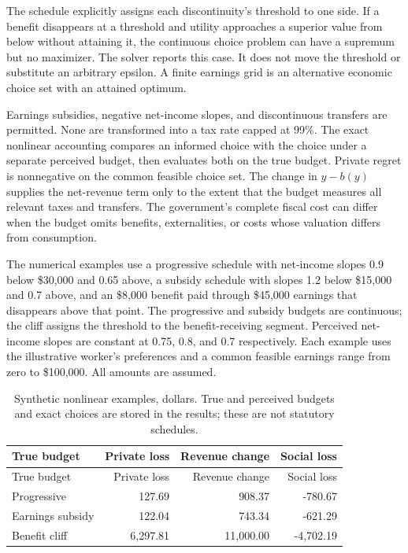 \documentclass[
  11pt,
  letterpaper,
  DIV=11,
  numbers=noendperiod]{scrartcl}
\begin{document}
The schedule explicitly assigns each discontinuity's threshold to one
side. If a benefit disappears at a threshold and utility approaches a
superior value from below without attaining it, the continuous choice
problem can have a supremum but no maximizer. The solver reports this
case. It does not move the threshold or substitute an arbitrary epsilon.
A finite earnings grid is an alternative economic choice set with an
attained optimum.

Earnings subsidies, negative net-income slopes, and discontinuous
transfers are permitted. None are transformed into a tax rate capped at
99\%. The exact nonlinear accounting compares an informed choice with
the choice under a separate perceived budget, then evaluates both on the
true budget. Private regret is nonnegative on the common feasible choice
set. The change in \(y-b(y)\) supplies the net-revenue term only to the
extent that the budget measures all relevant taxes and transfers. The
government's complete fiscal cost can differ when the budget omits
benefits, externalities, or costs whose valuation differs from
consumption.

The numerical examples use a progressive schedule with net-income slopes
0.9 below \$30,000 and 0.65 above, a subsidy schedule with slopes 1.2
below \$15,000 and 0.7 above, and an \$8,000 benefit paid through
\$45,000 earnings that disappears above that point. The progressive and
subsidy budgets are continuous; the cliff assigns the threshold to the
benefit-receiving segment. Perceived net-income slopes are constant at
0.75, 0.8, and 0.7 respectively. Each example uses the illustrative
worker's preferences and a common feasible earnings range from zero to
\$100,000. All amounts are assumed.

\begin{longtable}[]{@{}lrrr@{}}
\caption{Synthetic nonlinear examples, dollars. True and perceived
budgets and exact choices are stored in the results; these are not
statutory schedules.}\label{tbl-nonlinear}\tabularnewline
\toprule\noalign{}
True budget & Private loss & Revenue change & Social loss \\
\midrule\noalign{}
\endfirsthead
\toprule\noalign{}
True budget & Private loss & Revenue change & Social loss \\
\midrule\noalign{}
\endhead
\bottomrule\noalign{}
\endlastfoot
Progressive & 127.69 & 908.37 & -780.67 \\
Earnings subsidy & 122.04 & 743.34 & -621.29 \\
Benefit cliff & 6,297.81 & 11,000.00 & -4,702.19 \\
\end{longtable}
\end{document}
